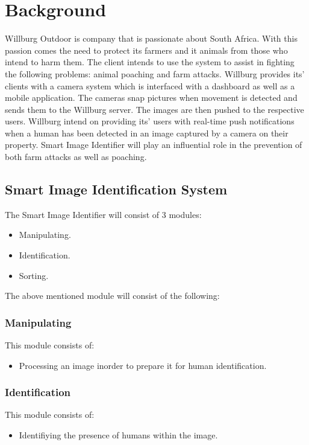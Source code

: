 \documentclass[a4paper,12pt]{report}
\begin{document}
\section {Background} \hfill \break
Willburg Outdoor is company that is passionate about South Africa. With this passion comes the need to protect its farmers and it animals from those who intend to harm them. The client intends to use the system to assist in fighting the following problems: animal poaching and farm attacks. 
Willburg provides its' clients with a camera system which is interfaced with a dashboard as well as a mobile application. The cameras snap pictures when movement is detected and sends them to the Willburg server. The images are then pushed to the respective users. Willburg intend on providing its' users with real-time push notifications when a human has been detected in an image captured by a camera on their property. Smart Image Identifier will play an influential role in the prevention of both farm attacks as well as poaching.

\subsection {Smart Image Identification System}
The Smart Image Identifier will consist of 3 modules:
	\begin {itemize}
		\item Manipulating.  
		\item Identification.
		\item Sorting.
	\end {itemize}

The above mentioned module will consist of the following:
	\subsubsection {Manipulating}
		This module consists of:
			\begin {itemize}
				\item Processing an image inorder to prepare it for human identification.
			\end {itemize}

	\subsubsection {Identification}
		This module consists of:
			\begin {itemize}
				\item Identifiying the presence of humans within the image.
			\end {itemize}
\end{document}
